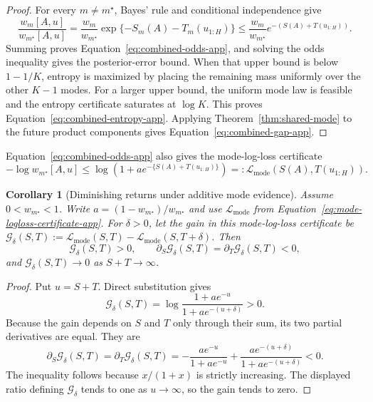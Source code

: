 \documentclass{article}
\newcommand{\1}{\mathbf 1}
\newtheorem{corollary}[theorem]{Corollary}
\theoremstyle{definition}
\begin{document}
\begin{proof}
For every $m\ne m^\star$, Bayes' rule and conditional independence give
\[
 \frac{w_m[A,u]}{w_{m^\star}[A,u]}
 =\frac{w_m}{w_{m^\star}}
 \exp\{-S_m(A)-T_m(u_{1:H})\}
 \le\frac{w_m}{w_{m^\star}}
 e^{-(S(A)+T(u_{1:H}))}.
\]
Summing proves Equation~\eqref{eq:combined-odds-app}, and solving the odds
inequality gives the posterior-error bound. When that upper bound is below
$1-1/K$, entropy is maximized by placing the remaining mass uniformly over
the other $K-1$ modes. For a larger upper bound, the uniform mode law is
feasible and the entropy certificate saturates at $\log K$. This proves
Equation~\eqref{eq:combined-entropy-app}. Applying
Theorem~\ref{thm:shared-mode} to the future product components gives
Equation~\eqref{eq:combined-gap-app}.
\end{proof}

Equation~\eqref{eq:combined-odds-app} also gives the mode-log-loss
certificate
\begin{equation}
 -\log w_{m^\star}[A,u]
 \le
 \log\!\left(1+a e^{-\{S(A)+T(u_{1:H})\}}\right)
 =:\mathcal L_{\mathrm{mode}}\!\left(S(A),T(u_{1:H})\right).
 \label{eq:mode-logloss-certificate-app}
\end{equation}

\begin{corollary}[Diminishing returns under additive mode evidence]
\label{cor:mode-diminishing-returns}
Assume $0<w_{m^\star}<1$. Write
$a=(1-w_{m^\star})/w_{m^\star}$ and use
$\mathcal L_{\mathrm{mode}}$ from
Equation~\eqref{eq:mode-logloss-certificate-app}.
For $\delta>0$, let the gain in this mode-log-loss certificate be
$\mathcal G_\delta(S,T):=\mathcal L_{\mathrm{mode}}(S,T)
-\mathcal L_{\mathrm{mode}}(S,T+\delta)$. Then
\begin{equation}
 \mathcal G_\delta(S,T)>0,
 \qquad
 \partial_S\mathcal G_\delta(S,T)
 =\partial_T\mathcal G_\delta(S,T)<0,
 \label{eq:mode-diminishing-returns}
\end{equation}
and $\mathcal G_\delta(S,T)\to0$ as $S+T\to\infty$.
\end{corollary}

\begin{proof}
Put $u=S+T$. Direct substitution gives
\[
 \mathcal G_\delta(S,T)
 =\log\frac{1+ae^{-u}}{1+ae^{-(u+\delta)}}>0.
\]
Because the gain depends on $S$ and $T$ only through their sum, its two partial
derivatives are equal. They are
\begin{equation}
 \partial_S\mathcal G_\delta(S,T)
 =\partial_T\mathcal G_\delta(S,T)
 =-\frac{ae^{-u}}{1+ae^{-u}}
 +\frac{ae^{-(u+\delta)}}{1+ae^{-(u+\delta)}}<0.
\end{equation}
The inequality follows because $x/(1+x)$ is strictly increasing. The displayed
ratio defining $\mathcal G_\delta$ tends to one as $u\to\infty$, so the gain
tends to zero.
\end{proof}
\end{document}

